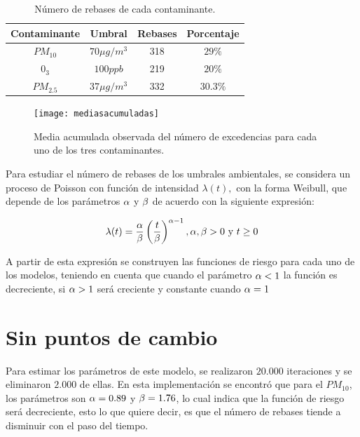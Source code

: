 \begin{table}[!h]
\begin{center}
\begin{tabular}{|c|c|c|c|}
\hline
Contaminante & Umbral & Rebases & Porcentaje \\
\hline \hline
$PM_{10}$ & $70\mu g /m^3$ &  318  & $29\%$ \\ \hline
$0_3$& $100 ppb$ &  219 & $20\%$  \\ \hline
$PM_{2.5}$ & $37\mu g /m^3$ & 332 & $30.3 \%$  \\ \hline
\end{tabular}
\caption{Número de rebases de cada contaminante.}
\label{rebasesporcontaminante}
\end{center}
\end{table}


 
\begin{figure}[!t]
\begin{center}
\texttt{[image: mediasacumuladas]}
\end{center}
\centering
\caption{Media acumulada observada del número de excedencias para cada uno de los tres contaminantes.}
\label{mediasacum}
\end{figure}

Para estudiar el número de rebases de los umbrales ambientales, se considera un proceso de Poisson con función de intensidad $\lambda (t),$ con la forma Weibull, que depende de los parámetros $\alpha$ y $\beta$ de acuerdo con la siguiente expresión: 

$$\lambda(t)=\frac{\alpha}{\beta}\left(\frac{t}{\beta}   \right)^{\alpha -1}, \alpha, \beta >0 \text{ y } t \geq 0 $$ 

A partir de esta expresión se construyen las funciones de riesgo para cada uno de los modelos, teniendo en cuenta que cuando el parámetro $\alpha<1$ la función es decreciente, si $\alpha>1$  será creciente y constante cuando $\alpha=1$
\newpage
\section{Sin puntos de cambio}

Para estimar los parámetros de este modelo, se realizaron $20.000$ iteraciones y se eliminaron $2.000$ de ellas. En esta implementación se encontró que para el $PM_{10}$, los parámetros son $\alpha=0.89$ y $\beta=1.76$, lo cual indica que la función de riesgo será decreciente, esto lo que quiere decir, es que el número de rebases tiende a disminuir con el paso del tiempo. 

